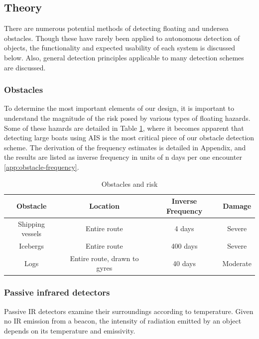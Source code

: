 \subsection{\label{sec:method:theory}Theory}
There are numerous potential methods of detecting floating and undersea obstacles. Though these have rarely been applied to autonomous detection of objects, the functionality and expected usability of each system is discussed below. Also, general detection principles applicable to many detection schemes are discussed.

\subsubsection{\label{sec:method:theory:obstacles}Obstacles}
To determine the most important elements of our design, it is important to understand the magnitude of the risk posed by various types of floating hazards. Some of these hazards are detailed in Table \ref{tab:obstacles}, where it becomes apparent that detecting large boats using AIS is the most critical piece of our obstacle detection scheme. The derivation of the frequency estimates is detailed in Appendix, and the results are listed as inverse frequency in units of n days per one encounter \ref{app:obstacle-frequency}.

\begin{table}
\caption{\label{tab:obstacles}Obstacles and risk}
\begin{tabular}{c|c|c|c}

Obstacle & Location & Inverse Frequency & Damage\\[0.6cm]
\hline

Shipping vessels & Entire route & 4 days & Severe \\
Icebergs & Entire route & 400 days & Severe \\
Logs & Entire route, drawn to gyres & 40 days & Moderate \\

\end{tabular}
\end{table}

\subsubsection{\label{sec:method:theory:passive-infrared-detectors}Passive infrared detectors}
Passive IR detectors examine their surroundings according to temperature. Given no IR emission from a beacon, the intensity of radiation emitted by an object depends on its temperature and emissivity.

